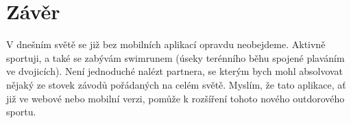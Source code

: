 \documentclass{article}
\begin{document}
\vspace{10 mm}
\section{Závěr}

V dnešním světě se již bez mobilních aplikací opravdu neobejdeme. Aktivně sportuji, a také se zabývám swimrunem (úseky terénního běhu spojené plaváním ve dvojicích). Není jednoduché nalézt partnera, se kterým bych mohl absolvovat nějaký ze stovek závodů pořádaných na celém světě. Myslím, že tato aplikace, ať již ve webové nebo mobilní verzi, pomůže k rozšíření tohoto nového outdorového sportu.
\end{document}
